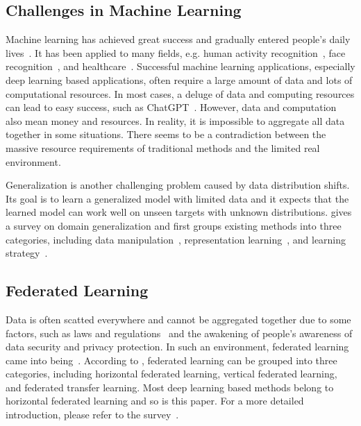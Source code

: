 \subsection{Challenges in Machine Learning}

Machine learning has achieved great success and gradually entered people's daily lives~\cite{sarker2021machine, paluru2021anam, wang2019deep}.
It has been applied to many fields, e.g. human activity recognition~\cite{lu2021cross}, face recognition~\cite{liu2022sphereface}, and healthcare~\cite{chen2022metafed}.
Successful machine learning applications, especially deep learning based applications, often require a large amount of data and lots of computational resources.
In most cases, a deluge of data and computing resources can lead to easy success, such as ChatGPT~\cite{van2023chatgpt}.
However, data and computation also mean money and resources.
In reality, it is impossible to aggregate all data together in some situations.
There seems to be a contradiction between the massive resource requirements of traditional methods and the limited real environment. %

Generalization is another challenging problem caused by data distribution shifts.
Its goal is to learn a generalized model with limited data and it expects that the learned model can work well on unseen targets with unknown distributions.
\cite{wang2022generalizing} gives a survey on domain generalization and first groups existing methods into three categories, including data manipulation~\cite{lu2022semantic}, representation learning~\cite{lu2022local}, and learning strategy~\cite{huang2020self}. 

\subsection{Federated Learning}
Data is often scatted everywhere and cannot be aggregated together due to some factors, such as laws and regulations~\cite{voigt2017eu} and the awakening of people's awareness of data security and privacy protection.
In such an environment, federated learning came into being~\cite{yang2019federated,roy2019braintorrent}.
According to \cite{yang2019federated}, federated learning can be grouped into three categories, including horizontal federated learning, vertical federated learning, and federated transfer learning.
Most deep learning based methods belong to horizontal federated learning and so is this paper.
For a more detailed introduction, please refer to the survey~\cite{liu2022distributed}.

